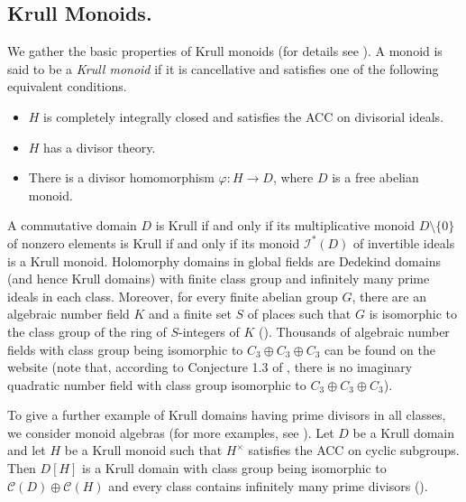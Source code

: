 \documentclass[a4paper, 10pt]{amsart}
\theoremstyle{plain}
\theoremstyle{definition}
\theoremstyle{definition}
\numberwithin{equation}{section}
\begin{document}
\smallskip
\noindent
\subsection{Krull Monoids.} \label{2.2}
We gather the basic properties of Krull monoids (for details see \cite[Chapter 2]{Ge-HK06a}). A monoid is said to be a {\it Krull monoid} if it is cancellative and satisfies one of the following equivalent conditions.
\begin{itemize}
\item[(a)] $H$ is completely integrally closed and satisfies the ACC on divisorial ideals.

\item[(b)] $H$ has a divisor theory.

\item[(c)] There is a divisor homomorphism $\varphi \colon H \to D$, where $D$ is a free abelian monoid.
\end{itemize}

A commutative domain $D$ is Krull if and only if its multiplicative monoid $D\setminus \{0\}$ of nonzero elements is Krull  if and only if its monoid $\mathcal I^* (D)$ of invertible ideals is a Krull monoid. Holomorphy domains in global fields are Dedekind domains (and hence Krull domains) with finite class group and infinitely many prime ideals in each class. Moreover, for every finite abelian group $G$, there are an algebraic number field $K$ and a finite set $S$ of places such that $G$ is isomorphic to the class group of the ring of $S$-integers of $K$ (\cite{Pe99}).
Thousands  of algebraic number fields with class group being isomorphic to $C_3 \oplus C_3 \oplus C_3$ can be found on the website \cite{lmfdb} (note that, according to Conjecture 1.3 of \cite{H-J-K-M-P19}, there is no imaginary quadratic number field with class group isomorphic to $C_3 \oplus C_3 \oplus C_3$).

To give a further example of Krull domains having prime divisors in all classes, we consider monoid algebras (for more examples, see \cite{Ge-HK06a, Ge-Zh20a}). Let $D$ be a Krull domain and let $H$ be a Krull monoid such that $H^{\times}$ satisfies the ACC on cyclic subgroups. Then $D[H]$ is a Krull domain with class group being isomorphic to $\mathcal C (D) \oplus \mathcal C (H)$ and every class contains infinitely many prime divisors (\cite{Fa-Wi22b}).

\smallskip
\noindent
\end{document}
